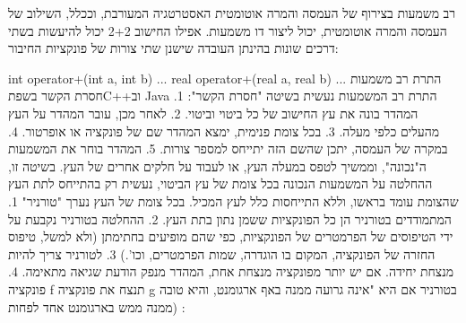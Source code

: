      רב משמעות בצירוף של העמסה והמרה אוטומטית
      האסטרטגיה המעורבת, וככלל, השילוב של העמסה והמרה אוטומטית, יכול ליצור דו משמעות. אפילו החישוב 2+2 יכול להיעשות בשתי דרכים שונות בהינתן העובדה שישנן שתי צורות של פונקציות החיבור:

      int operator+(int a, int b) {...}
      real operator+(real a, real b) {...}
      התרת רב משמעות חסרת הקשר
      בשפתC++וב Java התרת רב המשמעות נעשית בשיטה "חסרת הקשר":
      1. המהדר בונה את עץ החישוב של כל ביטוי וביטוי.
      2. לאחר מכן, עובר המהדר על העץ מהעלים כלפי מעלה.
      3. בכל צומת פנימית, ימצא המהדר שם של פונקציה או אופרטור.
      4. במקרה של העמסה, יתכן שהשם הזה יתייחס למספר צורות.
      5. המהדר בוחר את המשמעות ה"נכונה", וממשיך לטפס במעלה העץ, או לעבוד על חלקים אחרים של העץ.
      בשיטה זו, ההחלטה על המשמעות הנכונה בכל צומת של עץ הביטוי, נעשית רק בהתייחס לתת העץ שהצומת עומד בראשו, וללא התייחסות כלל לעץ המכיל. בכל צומת של העץ נערך "טורניר"
      1. המתמודדים בטורניר הן כל הפונקציות ששמן נתון בתת העץ.
      2. ההחלטה בטורניר נקבעת על ידי הטיפוסים של הפרמטרים של הפונקציות, כפי שהם מופיעים בחתימתן (ולא למשל, טיפוס החזרה של הפונקציה, המקום בו הוגדרה, שמות הפרמטרים, וכו'.)
      3. לטורניר צריך להיות מנצחת יחידה. אם יש יותר מפונקציה מנצחת אחת, המהדר מנפק הודעת שגיאה מתאימה.
      4. פונקציה f תנצח את פונקציה g בטורניר אם היא "אינה גרועה ממנה באף ארגומנט, והיא טובה ממנה ממש בארגומנט אחד לפחות) :

